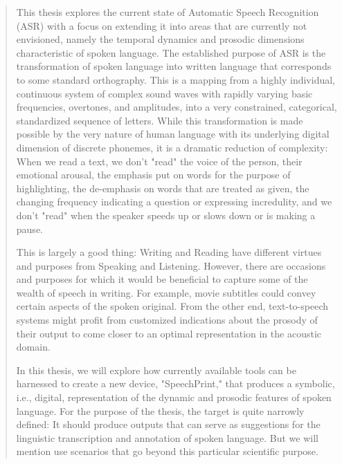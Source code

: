 
\begin{abstract}

This thesis explores the current state of Automatic Speech Recognition (ASR) with a focus on extending it into areas that are currently not envisioned, namely the temporal dynamics and prosodic dimensions characteristic of spoken language. The established purpose of ASR is the transformation of spoken language into written language that corresponds to some standard orthography. This is a mapping from a highly individual, continuous system of complex sound waves with rapidly varying basic frequencies, overtones, and amplitudes, into a very constrained, categorical, standardized sequence of letters. While this transformation is made possible by the very nature of human language with its underlying digital dimension of discrete phonemes, it is a dramatic reduction of complexity: When we read a text, we don't "read" the voice of the person, their emotional arousal, the emphasis put on words for the purpose of highlighting, the de-emphasis on words that are treated as given, the changing frequency indicating a question or expressing incredulity, and we don't "read" when the speaker speeds up or slows down or is making a pause.

This is largely a good thing: Writing and Reading have different virtues and purposes from Speaking and Listening. However, there are occasions and purposes for which it would be beneficial to capture some of the wealth of speech in writing. For example, movie subtitles could convey certain aspects of the spoken original. From the other end, text-to-speech systems might profit from customized indications about the prosody of their output to come closer to an optimal representation in the acoustic domain.

In this thesis, we will explore how currently available tools can be harnessed to create a new device, "SpeechPrint," that produces a symbolic, i.e., digital, representation of the dynamic and prosodic features of spoken language. For the purpose of the thesis, the target is quite narrowly defined: It should produce outputs that can serve as suggestions for the linguistic transcription and annotation of spoken language. But we will mention use scenarios that go beyond this particular scientific purpose.


\end{abstract}
